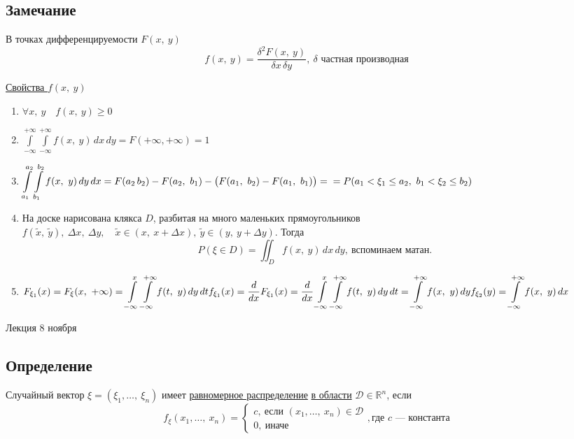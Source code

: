 \documentclass[12pt, a4paper]{article}
\begin{document}
    \subsection*{Замечание}
    В точках дифференцируемости $F(x,\ y)$
    \[f(x,\ y) = \frac{\delta^2 F(x,\ y)}{\delta x\, \delta y},\ \text{$\delta$ частная производная}\]
    \begin{center}
        \underline{Свойства $f(x,\ y)$}
    \end{center}
    \begin{enumerate}
        \item $\forall x,\ y\quad f(x,\ y) \geq 0$
        \item $\displaystyle \int\limits_{-\infty}^{+\infty}\int\limits_{-\infty}^{+\infty} f(x,\ y)\, dx\, dy = F(+\infty, +\infty) = 1$
        \item $\displaystyle \int\limits_{a_1}^{a_2} \int\limits_{b_1}^{b_2} f(x,\ y)\, dy\, dx = F(a_2\, b_2) - F(a_2,\ b_1) - \big(F(a_1,\ b_2) - F(a_1,\ b_1)\big) =\\
        = P(a_1 < \xi_1 \leq a_2,\ b_1 < \xi_2 \leq b_2)$
        \item На доске нарисована клякса $D$, разбитая на много маленьких прямоугольников\\
        $f(\tilde{x},\ \tilde{y}),\ \Delta x,\ \Delta y,\quad \tilde{x} \in (x,\ x + \Delta x),\ \tilde{y} \in (y,\ y + \Delta y)$. Тогда
        \[P(\xi \in D) = \iint_{D} f(x,\ y)\, dx\, dy,\ \text{вспоминаем матан.}\]
        \item $\displaystyle F_{\xi_1}(x) = F_{\xi}(x,\ +\infty) = \int\limits_{-\infty}^{x}\int\limits_{-\infty}^{+\infty} f(t,\ y)\, dy\, dt\\
        f_{\xi_1}(x) = \frac{d}{dx} F_{\xi_1}(x) = \frac{d}{dx} \int\limits_{-\infty}^{x}\int\limits_{-\infty}^{+\infty} f(t,\ y)\, dy\, dt = \int\limits_{-\infty}^{+\infty} f(x,\ y)\, dy\\
        f_{\xi_2}(y) = \int\limits_{-\infty}^{+\infty} f(x,\ y)\, dx$
    \end{enumerate}
    \begin{center}
        Лекция 8 ноября
    \end{center}
    \subsection*{Определение}
    Случайный вектор $\xi = (\xi_1,\dots,\ \xi_n)$ имеет \underline{равномерное распределение} \underline{в области} $\mathcal{D}\in \mathbb{R}^n$, если 
    \[f_{\xi}(x_1,\dots,\ x_n) = \begin{cases}
        c,\ \text{если } (x_1,\dots,\ x_n)\in \mathcal{D}\\
        0,\ \text{иначе}
    \end{cases}, \text{где $c$ --- константа}\]
\end{document}
